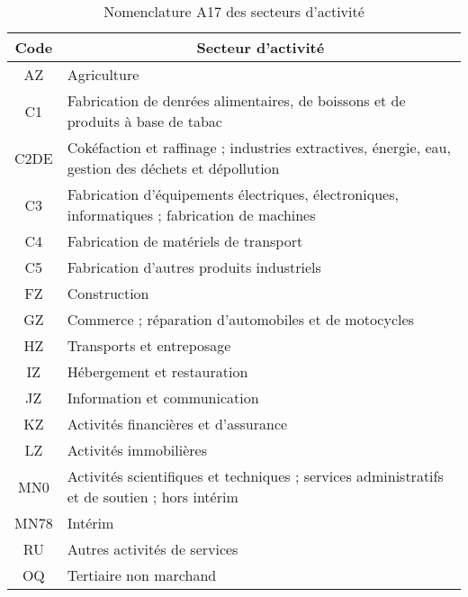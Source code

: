 \documentclass{article}
\begin{document}
\begin{center}
\begin{table}[h!]
\caption{Nomenclature A17 des secteurs d'activité}
\begin{tabular}{|c|l|}
\hline
\textbf{Code} & \multicolumn{1}{c|}{\textbf{Secteur d'activité}}                                                    \\ \hline \hline
AZ            & Agriculture                                                                                         \\ \hline
C1            & Fabrication de denrées alimentaires, de boissons et de produits à base de tabac                     \\ \hline
C2DE          & Cokéfaction et raffinage ; industries extractives, énergie, eau, gestion des déchets et dépollution \\ \hline
C3            & Fabrication d'équipements électriques, électroniques, informatiques ; fabrication de machines       \\ \hline
C4            & Fabrication de matériels de transport                                                               \\ \hline
C5            & Fabrication d'autres produits industriels                                                           \\ \hline
FZ            & Construction                                                                                        \\ \hline
GZ            & Commerce ; réparation d'automobiles et de motocycles                                                \\ \hline
HZ            & Transports et entreposage                                                                           \\ \hline
IZ            & Hébergement et restauration                                                                         \\ \hline
JZ            & Information et communication                                                                        \\ \hline
KZ            & Activités financières et d'assurance                                                                \\ \hline
LZ            & Activités immobilières                                                                              \\ \hline
MN0           & Activités scientifiques et techniques ; services administratifs et de soutien ; hors intérim        \\ \hline
MN78          & Intérim                                                                                             \\ \hline
RU            & Autres activités de services                                                                        \\ \hline
OQ            & Tertiaire non marchand                                                                              \\ \hline
\end{tabular}
\end{table}
\end{center}
\end{document}
